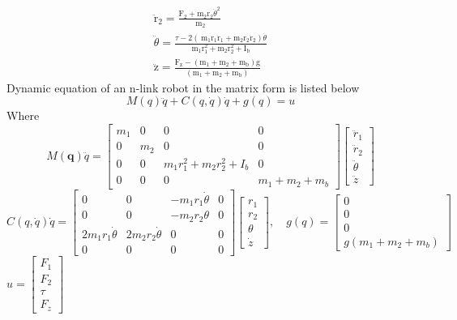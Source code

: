 \documentclass{UoNMCHA}
\numberwithin{equation}{section}
\begin{document}
$$
\begin{array}{c}
\ddot{\mathrm{r}}_{2}=\frac{\mathrm{F}_{2}+\mathrm{m}_{2} \mathrm{r}_{2} \dot{\theta}^{2}}{\mathrm{~m}_{2}} \\
\ddot{\theta}=\frac{\tau-2\left(\mathrm{~m}_{1} \mathrm{r}_{1} \dot{\mathrm{r}}_{1}+\mathrm{m}_{2} \mathrm{r}_{2} \dot{\mathrm{r}}_{2}\right) \dot{\theta}}{\mathrm{m}_{1} \mathrm{r}_{1}^{2}+\mathrm{m}_{2} \mathrm{r}_{2}^{2}+\mathrm{I}_{\mathrm{b}}} \\
\ddot{\mathrm{z}}=\frac{\mathrm{F}_{\mathrm{z}}-\left(\mathrm{m}_{1}+\mathrm{m}_{2}+\mathrm{m}_{\mathrm{b}}\right) \mathrm{g}}{\left(\mathrm{m}_{1}+\mathrm{m}_{2}+\mathrm{m}_{\mathrm{b}}\right)}
\end{array}
$$
Dynamic equation of an n-link robot in the matrix form is listed below
$$
M(q) \ddot{q}+C(q, \dot{q}) \dot{q}+g(q)=u
$$
Where
$$
M(\boldsymbol{q}) \ddot{q}=\left[\begin{array}{cccc}
m_{1} & 0 & 0 & 0 \\
0 & m_{2} & 0 & 0 \\
0 & 0 & m_{1} r_{1}^{2}+m_{2} r_{2}^{2}+I_{b} & 0 \\
0 & 0 & 0 & m_{1}+m_{2}+m_{b}
\end{array}\right]\left[\begin{array}{c}
\ddot{r}_{1} \\
\ddot{r}_{2} \\
\ddot{\theta} \\
\ddot{z}
\end{array}\right]
$$
$C(q, \dot{q}) \dot{q}=\left[\begin{array}{cccc}0 & 0 & -m_{1} r_{1} \dot{\theta} & 0 \\ 0 & 0 & -m_{2} r_{2} \theta & 0 \\ 2 m_{1} r_{1} \dot{\theta} & 2 m_{2} r_{2} \dot{\theta} & 0 & 0 \\ 0 & 0 & 0 & 0\end{array}\right]\left[\begin{array}{c}r_{1} \\ r_{2} \\ \theta \\ \dot{z}\end{array}\right], \quad g(q)=\left[\begin{array}{c}0 \\ 0 \\ 0 \\ g\left(m_{1}+m_{2}+m_{b}\right)\end{array}\right]$
$u=\left[\begin{array}{c}F_{1} \\ F_{2} \\ \tau \\ F_{z}\end{array}\right]$
\end{document}
